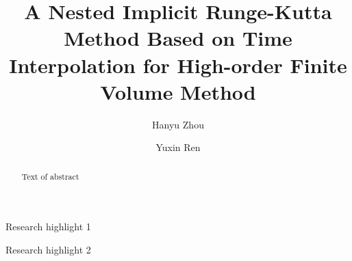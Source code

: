 \documentclass[preprint,12pt]{elsarticle}
\begin{document}
\begin{frontmatter}


    \title{A Nested Implicit Runge-Kutta Method
        Based on Time Interpolation
        for High-order Finite Volume Method}




    \author[THUDEM]{Hanyu Zhou}
    \author[THUDEM]{Yuxin Ren}




    \begin{abstract}
        Text of abstract

    \end{abstract}


    \begin{highlights}
        \item Research highlight 1
        \item Research highlight 2
    \end{highlights}


\end{frontmatter}
\end{document}
